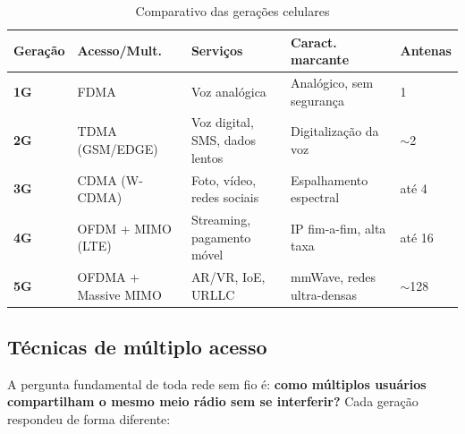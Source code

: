 \documentclass[11pt,a4paper]{article}
\begin{document}
\begin{table}[h!]
\centering
\caption{Comparativo das gerações celulares}
\label{tab:geracoes}
\begin{tabularx}{\textwidth}{lXXXX}
\toprule
\textbf{Geração} & \textbf{Acesso/Mult.} & \textbf{Serviços} & \textbf{Caract. marcante} & \textbf{Antenas} \\
\midrule
\textbf{1G} & FDMA & Voz analógica & Analógico, sem segurança & 1 \\
\textbf{2G} & TDMA (GSM/EDGE) & Voz digital, SMS, dados lentos & Digitalização da voz & $\sim$2 \\
\textbf{3G} & CDMA (W-CDMA) & Foto, vídeo, redes sociais & Espalhamento espectral & até 4 \\
\textbf{4G} & OFDM + MIMO (LTE) & Streaming, pagamento móvel & IP fim-a-fim, alta taxa & até 16 \\
\textbf{5G} & OFDMA + Massive MIMO & AR/VR, IoE, URLLC & mmWave, redes ultra-densas & $\sim$128 \\
\bottomrule
\end{tabularx}
\end{table}

\subsection{Técnicas de múltiplo acesso}

A pergunta fundamental de toda rede sem fio é: \textbf{como múltiplos usuários compartilham o mesmo meio rádio sem se interferir?} Cada geração respondeu de forma diferente:
\end{document}
